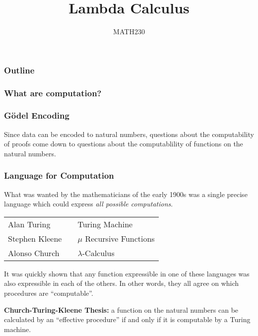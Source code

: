 \documentclass{beamer}
\title{Lambda Calculus}
\author{MATH230}
\institute{Te Kura P\=angarau \\ Te Whare W\=ananga o Waitaha}
\date{}
\begin{document}
\begin{frame}

  \titlepage

\end{frame}

\begin{frame}
  \frametitle{Outline}

  \tableofcontents

\end{frame}

\begin{frame}
	\frametitle{What are computation?}

	

\end{frame}

\begin{frame}
	\frametitle{G\"{o}del Encoding}

	Since data can be encoded to natural numbers, questions about the computability of proofs come down to questions about the computablility of functions on the natural numbers. 

\end{frame}

\begin{frame}
	\frametitle{Language for Computation}
	What was wanted by the mathematicians of the early 1900s was a single precise language which could express \emph{all possible computations}. 
	
	
	\begin{center}
		\begin{tabular}{l c l}
			Alan Turing & & Turing Machine \\
			Stephen Kleene & & $\mu$ Recursive Functions \\
			Alonso Church & & $\lambda$-Calculus
		\end{tabular}
	\end{center}

	It was quickly shown that any function expressible in one of these languages was also expressible in each of the others. In other words, they all agree on which procedures are ``computable''. 

	{\bf Church-Turing-Kleene Thesis:} a function on the natural numbers can be calculated by an ``effective procedure'' if and only if it is computable by a Turing machine. 
\end{frame}
\end{document}
